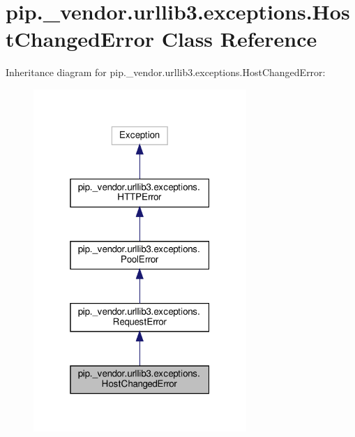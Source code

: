 \hypertarget{classpip_1_1__vendor_1_1urllib3_1_1exceptions_1_1HostChangedError}{}\section{pip.\+\_\+vendor.\+urllib3.\+exceptions.\+Host\+Changed\+Error Class Reference}
\label{classpip_1_1__vendor_1_1urllib3_1_1exceptions_1_1HostChangedError}


Inheritance diagram for pip.\+\_\+vendor.\+urllib3.\+exceptions.\+Host\+Changed\+Error\+:
\nopagebreak
\begin{figure}[H]
\begin{center}
\leavevmode
\includegraphics[width=229pt]{classpip_1_1__vendor_1_1urllib3_1_1exceptions_1_1HostChangedError__inherit__graph}
\end{center}
\end{figure}



